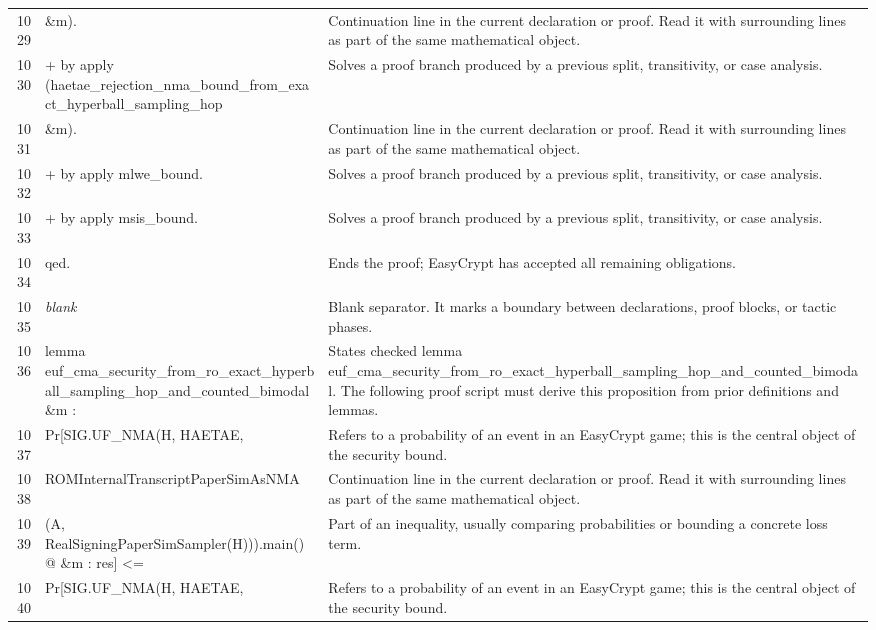\documentclass[10pt]{article}
\begin{document}
\begin{longtable}{r L{0.53\textwidth} L{0.37\textwidth}}
1029 & {\ttfamily\scriptsize          \&m).} & Continuation line in the current declaration or proof.  Read it with surrounding lines as part of the same mathematical object. \\
1030 & {\ttfamily\scriptsize + by apply (haetae\_rejection\_nma\_bound\_from\_exact\_hyperball\_sampling\_hop} & Solves a proof branch produced by a previous split, transitivity, or case analysis. \\
1031 & {\ttfamily\scriptsize               \&m).} & Continuation line in the current declaration or proof.  Read it with surrounding lines as part of the same mathematical object. \\
1032 & {\ttfamily\scriptsize + by apply mlwe\_bound.} & Solves a proof branch produced by a previous split, transitivity, or case analysis. \\
1033 & {\ttfamily\scriptsize + by apply msis\_bound.} & Solves a proof branch produced by a previous split, transitivity, or case analysis. \\
1034 & {\ttfamily\scriptsize qed.} & Ends the proof; EasyCrypt has accepted all remaining obligations. \\
1035 & {\ttfamily\scriptsize \emph{blank}} & Blank separator.  It marks a boundary between declarations, proof blocks, or tactic phases. \\
1036 & {\ttfamily\scriptsize lemma euf\_cma\_security\_from\_ro\_exact\_hyperball\_sampling\_hop\_and\_counted\_bimodal \&m :} & States checked lemma euf\_cma\_security\_from\_ro\_exact\_hyperball\_sampling\_hop\_and\_counted\_bimodal.  The following proof script must derive this proposition from prior definitions and lemmas. \\
1037 & {\ttfamily\scriptsize   Pr[SIG.UF\_NMA(H, HAETAE,} & Refers to a probability of an event in an EasyCrypt game; this is the central object of the security bound. \\
1038 & {\ttfamily\scriptsize        ROMInternalTranscriptPaperSimAsNMA} & Continuation line in the current declaration or proof.  Read it with surrounding lines as part of the same mathematical object. \\
1039 & {\ttfamily\scriptsize          (A, RealSigningPaperSimSampler(H))).main() @ \&m : res] <=} & Part of an inequality, usually comparing probabilities or bounding a concrete loss term. \\
1040 & {\ttfamily\scriptsize   Pr[SIG.UF\_NMA(H, HAETAE,} & Refers to a probability of an event in an EasyCrypt game; this is the central object of the security bound. \\

\end{longtable}
\end{document}
